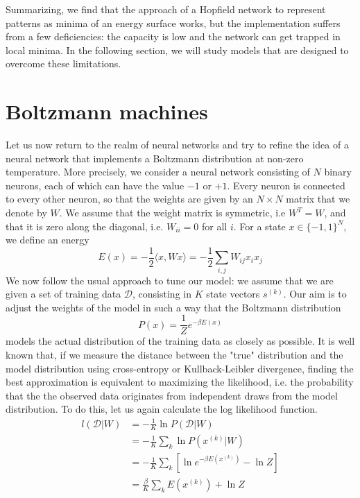 \documentclass[a4paper, draft]{article}
\theoremstyle{own}
\theoremstyle{remark}
\begin{document}
Summarizing, we find that the approach of a Hopfield network to represent patterns as minima of an energy surface works, but the implementation suffers from a few deficiencies: the capacity is low and the network can get trapped in local minima. In the following section, we will study models that are designed to overcome these limitations.


\section{Boltzmann machines}

Let us now return to the realm of neural networks and try to refine the idea of a neural network that implements a Boltzmann distribution at non-zero temperature. More precisely, we consider a neural network consisting of $N$ binary neurons, each of which can have the value $-1$ or $+1$. Every neuron is connected to every other neuron, so that the weights are given by an $N \times N$ matrix that we denote by $W$. We assume that the weight matrix is symmetric, i.e $W^T = W$, and that it is zero along the diagonal, i.e. $W_{ii} = 0$ for all $i$. For a state $x \in \{ -1, 1\}^N$, we define an
energy
$$
E(x) = - \frac{1}{2} \langle x, Wx \rangle = - \frac{1}{2} \sum_{i,j} W_{ij} x_i x_j
$$
We now follow the usual approach to tune our model: we assume that we are given a set of training data ${\mathcal D}$, consisting in $K$ state vectors $s^{(k)}$. Our aim is to adjust the weights of the model in such a way that the Boltzmann distribution 
$$
P(x) = \frac{1}{Z} e^{-\beta E(x)}
$$
models the actual distribution of the training data as closely as possible. It is well known that, if we measure the distance between the "true" distribution and the model distribution using cross-entropy or Kullback-Leibler divergence, finding the best approximation is equivalent to maximizing the likelihood, i.e. the probability that the the observed data originates from independent draws from the model distribution. To do this, let us again calculate the log likelihood function.
\begin{align*}
l({\mathcal D} | W) &= - \frac{1}{K} \ln P({\mathcal D} | W) \\
&= - \frac{1}{K} \sum_k \ln P(x^{(k)} | W) \\
&= - \frac{1}{K} \sum_k \left[ \ln e^{-\beta E(x^{(k)})} - \ln Z \right] \\
&=  \frac{\beta}{K} \sum_k E(x^{(k)}) + \ln Z
\end{align*}
\end{document}
